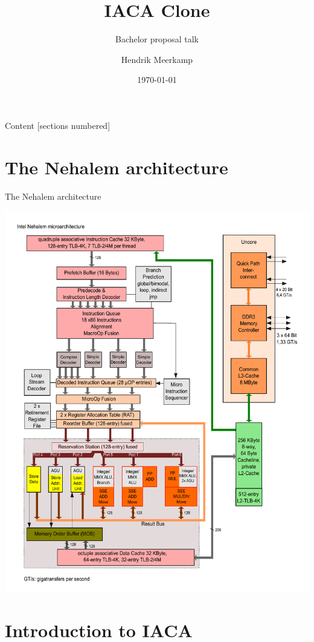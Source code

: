 \documentclass[10pt, tikz,border=2mm, xcolor=dvipsnames]{beamer}
\title{IACA Clone}
\subtitle{Bachelor proposal talk}
\date{\today}
\author{Hendrik Meerkamp}
\institute{}
\begin{document}
\maketitle

\begin{frame}{Content}
  [sections numbered]
  \tableofcontents[hideallsubsections]
\end{frame}

\section{The Nehalem architecture}

\begin{frame}{The Nehalem architecture}
\begin{center}
\includegraphics[scale=.26, trim={0 0 0 2,35cm}]{Intel_Nehalem_arch}
\end{center}
\end{frame}

\section{Introduction to IACA}
\end{document}
